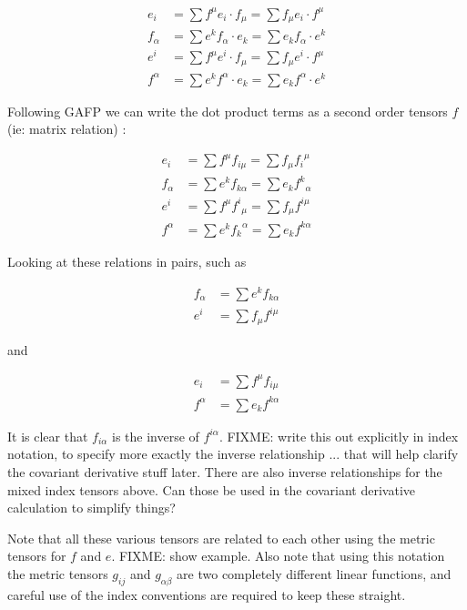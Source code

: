 \documentclass{article}      %
\begin{document}
\begin{align*}
e_i 		&= \sum f^{\mu} e_i \cdot f_{\mu} 	= \sum f_{\mu} e_i \cdot f^{\mu} \\
f_{\alpha} 	&= \sum e^k f_{\alpha} \cdot e_k 	= \sum e_k f_{\alpha} \cdot e^k \\
e^i 		&= \sum f^{\mu} e^i \cdot f_{\mu} 	= \sum f_{\mu} e^i \cdot f^{\mu} \\
f^{\alpha} 	&= \sum e^k f^{\alpha} \cdot e_k 	= \sum e_k f^{\alpha} \cdot e^k 
\end{align*}

Following GAFP we can write the dot product terms as a second order tensors $f$ (ie: matrix relation) :

\begin{align*}
e_i 		&= \sum f^{\mu} f_{i\mu}  	= \sum f_{\mu} {f_i}^{\mu} \\
f_{\alpha} 	&= \sum e^k f_{k\alpha} 	= \sum e_k {f^k}_{\alpha} \\
e^i 		&= \sum f^{\mu} {f^i}_{\mu} 	= \sum f_{\mu} f^{i \mu} \\
f^{\alpha} 	&= \sum e^k {f_k}^{\alpha}  	= \sum e_k f^{k\alpha}
\end{align*}

Looking at these relations in pairs, such as

\begin{align*}
f_{\alpha} 	&= \sum e^k f_{k\alpha} \\ 
e^i 		&= \sum f_{\mu} f^{i \mu} 
\end{align*}

and 

\begin{align*}
e_i 		&= \sum f^{\mu} f_{i\mu} \\
f^{\alpha} 	&= \sum e_k f^{k\alpha}
\end{align*}

It is clear that $f_{i\alpha}$ is the inverse of $f^{i\alpha}$.  FIXME: write this out explicitly in index notation, to specify
more exactly the inverse relationship ... that will help clarify the covariant derivative stuff later.  There are also inverse relationships for the mixed index tensors above.  Can those be used in the covariant derivative calculation to simplify things?

Note that all these various tensors are related to each other using the metric tensors for $f$ and $e$.  FIXME: show example.  Also note that using this notation the metric tensors $g_{ij}$ and $g_{\alpha\beta}$ are two completely different linear functions, and careful use of the index conventions are required to keep these straight.
\end{document}

